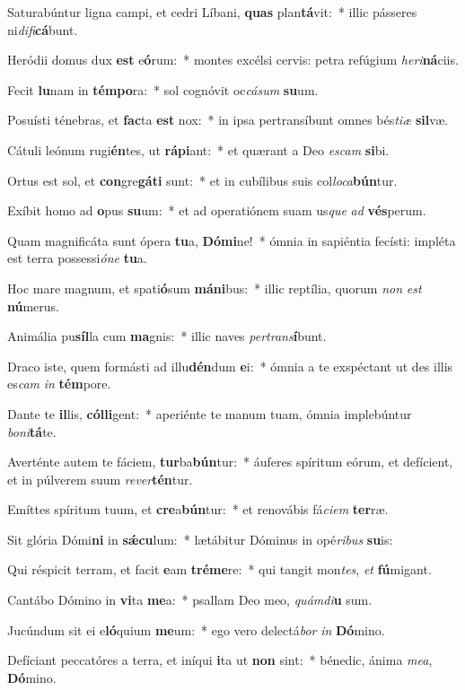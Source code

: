 \item Saturabúntur ligna campi, et cedri Líbani, \textbf{quas} plan\textbf{tá}vit:~* illic pásseres ni\textit{di}\textit{fi}\textbf{cá}bunt.
\item Heródii domus dux \textbf{est} e\textbf{ó}rum:~* montes excélsi cervis: petra refúgium \textit{he}\textit{ri}\textbf{ná}ciis.
\item Fecit \textbf{lu}nam in \textbf{tém}\textbf{po}ra:~* sol cognóvit oc\textit{cá}\textit{sum} \textbf{su}um.
\item Posuísti ténebras, et \textbf{fac}ta \textbf{est} nox:~* in ipsa pertransíbunt omnes bés\textit{ti}\textit{æ} \textbf{sil}væ.
\item Cátuli leónum rugi\textbf{én}tes, ut \textbf{rá}\textbf{pi}ant:~* et quærant a Deo \textit{es}\textit{cam} \textbf{si}bi.
\item Ortus est sol, et \textbf{con}gre\textbf{gá}\textbf{ti} sunt:~* et in cubílibus suis col\textit{lo}\textit{ca}\textbf{bún}tur.
\item Exíbit homo ad \textbf{o}pus \textbf{su}um:~* et ad operatiónem suam us\textit{que} \textit{ad} \textbf{vés}perum.
\item Quam magnificáta sunt ópera \textbf{tu}a, \textbf{Dó}\textbf{mi}ne!~* ómnia in sapiéntia fecísti: impléta est terra possessi\textit{ó}\textit{ne} \textbf{tu}a.
\item Hoc mare magnum, et spati\textbf{ó}sum \textbf{má}\textbf{ni}bus:~* illic reptília, quorum \textit{non} \textit{est} \textbf{nú}merus.
\item Animália pu\textbf{síl}la cum \textbf{ma}gnis:~* illic naves \textit{per}\textit{trans}\textbf{í}bunt.
\item Draco iste, quem formásti ad illu\textbf{dén}dum \textbf{e}i:~* ómnia a te exspéctant ut des illis es\textit{cam} \textit{in} \textbf{tém}pore.
\item Dante te \textbf{il}lis, \textbf{cól}\textbf{li}gent:~* aperiénte te manum tuam, ómnia implebúntur \textit{bo}\textit{ni}\textbf{tá}te.
\item Averténte autem te fáciem, \textbf{tur}ba\textbf{bún}tur:~* áuferes spíritum eórum, et defícient, et in púlverem suum \textit{re}\textit{ver}\textbf{tén}tur.
\item Emíttes spíritum tuum, et \textbf{cre}a\textbf{bún}tur:~* et renovábis fá\textit{ci}\textit{em} \textbf{ter}ræ.
\item Sit glória Dómi\textbf{ni} in \textbf{sǽ}\textbf{cu}lum:~* lætábitur Dóminus in opé\textit{ri}\textit{bus} \textbf{su}is:
\item Qui réspicit terram, et facit \textbf{e}am \textbf{tré}\textbf{me}re:~* qui tangit mon\textit{tes}, \textit{et} \textbf{fú}migant.
\item Cantábo Dómino in \textbf{vi}ta \textbf{me}a:~* psallam Deo meo, \textit{quám}\textit{di}\textbf{u} sum.
\item Jucúndum sit ei e\textbf{ló}quium \textbf{me}um:~* ego vero delectá\textit{bor} \textit{in} \textbf{Dó}mino.
\item Defíciant peccatóres a terra, et iníqui \textbf{i}ta ut \textbf{non} sint:~* bénedic, ánima \textit{me}\textit{a}, \textbf{Dó}mino.
